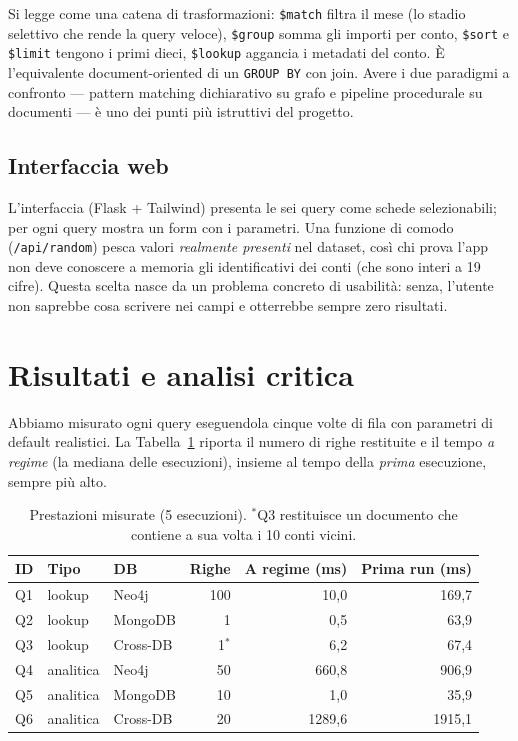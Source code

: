 \documentclass[11pt,a4paper]{article}
\begin{document}
Si legge come una catena di trasformazioni: \texttt{\$match} filtra il mese
(lo stadio selettivo che rende la query veloce), \texttt{\$group} somma gli
importi per conto, \texttt{\$sort} e \texttt{\$limit} tengono i primi dieci,
\texttt{\$lookup} aggancia i metadati del conto. \`E l'equivalente
document-oriented di un \texttt{GROUP BY} con join. Avere i due paradigmi a
confronto --- pattern matching dichiarativo su grafo e pipeline procedurale su
documenti --- \`e uno dei punti pi\`u istruttivi del progetto.

\subsection{Interfaccia web}

L'interfaccia (Flask + Tailwind) presenta le sei query come schede selezionabili;
per ogni query mostra un form con i parametri. Una funzione di comodo
(\texttt{/api/random}) pesca valori \emph{realmente presenti} nel dataset, cos\`i
chi prova l'app non deve conoscere a memoria gli identificativi dei conti (che
sono interi a 19 cifre). Questa scelta nasce da un problema concreto di
usabilit\`a: senza, l'utente non saprebbe cosa scrivere nei campi e otterrebbe
sempre zero risultati.

\section{Risultati e analisi critica}
\label{sec:risultati}

Abbiamo misurato ogni query eseguendola cinque volte di fila con parametri di
default realistici. La Tabella~\ref{tab:perf} riporta il numero di righe
restituite e il tempo \emph{a regime} (la mediana delle esecuzioni), insieme al
tempo della \emph{prima} esecuzione, sempre pi\`u alto.

\begin{table}[h]
\centering
\begin{tabular}{lllrrr}
\toprule
\textbf{ID} & \textbf{Tipo} & \textbf{DB} & \textbf{Righe} & \textbf{A regime (ms)} & \textbf{Prima run (ms)} \\
\midrule
Q1 & lookup    & Neo4j    & 100 & 10,0   & 169,7 \\
Q2 & lookup    & MongoDB  & 1   & 0,5    & 63,9 \\
Q3 & lookup    & Cross-DB & 1$^{*}$ & 6,2 & 67,4 \\
Q4 & analitica & Neo4j    & 50  & 660,8  & 906,9 \\
Q5 & analitica & MongoDB  & 10  & 1,0    & 35,9 \\
Q6 & analitica & Cross-DB & 20  & 1289,6 & 1915,1 \\
\bottomrule
\end{tabular}
\caption{Prestazioni misurate (5 esecuzioni). $^{*}$Q3 restituisce un documento
che contiene a sua volta i 10 conti vicini.}
\label{tab:perf}
\end{table}
\end{document}
